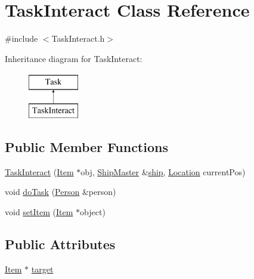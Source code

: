 \hypertarget{classTaskInteract}{\section{Task\-Interact Class Reference}
\label{classTaskInteract}
}


{\ttfamily \#include $<$Task\-Interact.\-h$>$}

Inheritance diagram for Task\-Interact\-:\begin{figure}[H]
\begin{center}
\leavevmode
\includegraphics[height=2.000000cm]{classTaskInteract}
\end{center}
\end{figure}
\subsection*{Public Member Functions}
\begin{DoxyCompactItemize}
\item 
\hyperlink{classTaskInteract_a4c3bd10b67882eca11b6d60d77441d78}{Task\-Interact} (\hyperlink{classItem}{Item} $\ast$obj, \hyperlink{classShipMaster}{Ship\-Master} \&\hyperlink{classTask_af765f4e3eab35d064f5cf18506b7c9a2}{ship}, \hyperlink{structLocation}{Location} current\-Pos)
\item 
void \hyperlink{classTaskInteract_ae70faf65b992b6d6d6a32597b3b2ecec}{do\-Task} (\hyperlink{classPerson}{Person} \&person)
\item 
void \hyperlink{classTaskInteract_ad628c33366242e400734bddd4b120104}{set\-Item} (\hyperlink{classItem}{Item} $\ast$object)
\end{DoxyCompactItemize}
\subsection*{Public Attributes}
\begin{DoxyCompactItemize}
\item 
\hyperlink{classItem}{Item} $\ast$ \hyperlink{classTaskInteract_ab84e9122334cfd0e1a32eac3bbba2e2d}{target}
\end{DoxyCompactItemize}


